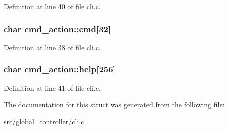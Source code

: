 Definition at line 40 of file cli.\-c.

\hypertarget{structcmd__action_a35a18d029cdcc1a21d74f5a6eadd95a9}{
\subsubsection[{cmd}]{\setlength{\rightskip}{0pt plus 5cm}char cmd\-\_\-action\-::cmd\mbox{[}32\mbox{]}}}\label{structcmd__action_a35a18d029cdcc1a21d74f5a6eadd95a9}


Definition at line 38 of file cli.\-c.

\hypertarget{structcmd__action_a426f4bdd272623577e9a5e8cafa85656}{
\subsubsection[{help}]{\setlength{\rightskip}{0pt plus 5cm}char cmd\-\_\-action\-::help\mbox{[}256\mbox{]}}}\label{structcmd__action_a426f4bdd272623577e9a5e8cafa85656}


Definition at line 41 of file cli.\-c.



The documentation for this struct was generated from the following file\-:\begin{DoxyCompactItemize}
\item 
src/global\-\_\-controller/\hyperlink{cli_8c}{cli.\-c}\end{DoxyCompactItemize}
